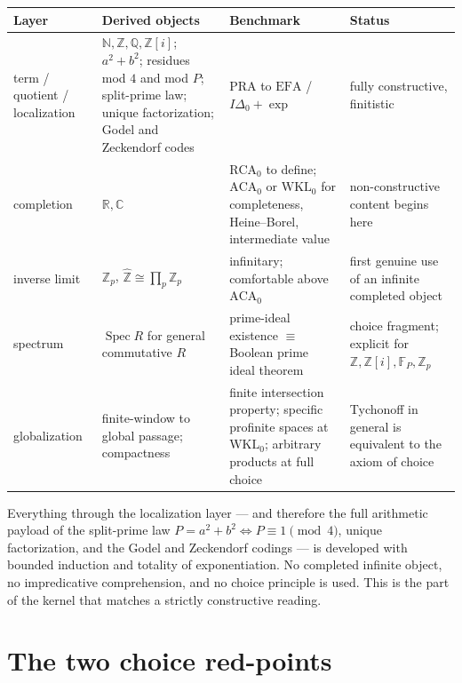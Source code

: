 \begin{center}
\begin{tabular}{@{}p{2.7cm}p{4.3cm}p{3.2cm}p{3.2cm}@{}}
\toprule
\textbf{Layer} & \textbf{Derived objects} & \textbf{Benchmark} & \textbf{Status}\\
\midrule
term / quotient / localization &
$\mathbb N,\mathbb Z,\mathbb Q,\mathbb Z[i]$; $a^2+b^2$; residues mod $4$ and
mod $P$; split-prime law; unique factorization; Godel and Zeckendorf codes &
$\mathrm{PRA}$ to $\mathrm{EFA}$ / $I\Delta_0+\exp$ &
fully constructive, finitistic \\
\addlinespace
completion &
$\mathbb R,\mathbb C$ &
$\mathrm{RCA}_0$ to define; $\mathrm{ACA}_0$ or $\mathrm{WKL}_0$ for
completeness, Heine--Borel, intermediate value &
non-constructive content begins here \\
\addlinespace
inverse limit &
$\mathbb Z_p$, $\widehat{\mathbb Z}\cong\prod_p\mathbb Z_p$ &
infinitary; comfortable above $\mathrm{ACA}_0$ &
first genuine use of an infinite completed object \\
\addlinespace
spectrum &
$\operatorname{Spec}R$ for general commutative $R$ &
prime-ideal existence $\equiv$ Boolean prime ideal theorem &
choice fragment; explicit for $\mathbb Z,\mathbb Z[i],\mathbb F_P,\mathbb Z_p$ \\
\addlinespace
globalization &
finite-window to global passage; compactness &
finite intersection property; specific profinite spaces at $\mathrm{WKL}_0$;
arbitrary products at full choice &
Tychonoff in general is equivalent to the axiom of choice \\
\bottomrule
\end{tabular}
\end{center}

\begin{principle}
\label{prin:ontology-kernel-base-finitistic}
Everything through the localization layer --- and therefore the full arithmetic
payload of the split-prime law $P=a^2+b^2\iff P\equiv1\pmod4$, unique
factorization, and the Godel and Zeckendorf codings --- is developed with
bounded induction and totality of exponentiation.  No completed infinite object,
no impredicative comprehension, and no choice principle is used.  This is the
part of the kernel that matches a strictly constructive reading.
\end{principle}

\section{The two choice red-points}
\label{sec:ontology-kernel-choice-red-points}

